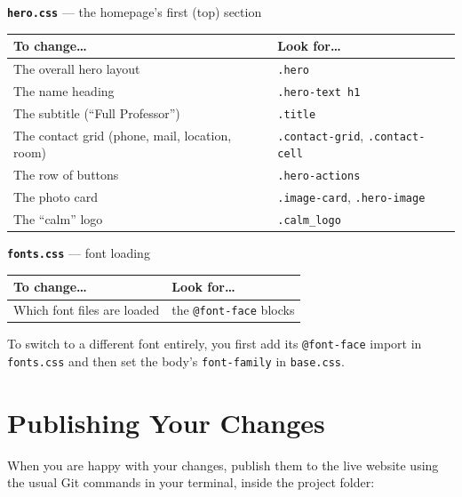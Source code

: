 \documentclass[11pt,a4paper]{article}
\newcommand{\file}[1]{\texttt{#1}}
\begin{document}
\vspace{4pt}
\noindent\textbf{\file{hero.css}} --- the homepage's first (top) section
\begin{center}
\begin{tabular}{@{}p{8.0cm}p{7.0cm}@{}}
\textbf{To change\dots} & \textbf{Look for\dots} \\[2pt]
\hline
\rule{0pt}{2.4ex}%
The overall hero layout & \texttt{.hero} \\[3pt]
The name heading & \texttt{.hero-text h1} \\[3pt]
The subtitle (``Full Professor'') & \texttt{.title} \\[3pt]
The contact grid (phone, mail, location, room) & \texttt{.contact-grid}, \texttt{.contact-cell} \\[3pt]
The row of buttons & \texttt{.hero-actions} \\[3pt]
The photo card & \texttt{.image-card}, \texttt{.hero-image} \\[3pt]
The ``calm'' logo & \texttt{.calm\_logo} \\
\end{tabular}
\end{center}

\vspace{4pt}
\noindent\textbf{\file{fonts.css}} --- font loading
\begin{center}
\begin{tabular}{@{}p{8.0cm}p{7.0cm}@{}}
\textbf{To change\dots} & \textbf{Look for\dots} \\[2pt]
\hline
\rule{0pt}{2.4ex}%
Which font files are loaded & the \texttt{@font-face} blocks \\
\end{tabular}
\end{center}

\begin{notebox}
To switch to a different font entirely, you first add its \texttt{@font-face}
import in \file{fonts.css} and then set the body's \texttt{font-family} in
\file{base.css}.
\end{notebox}

\section{Publishing Your Changes}

When you are happy with your changes, publish them to the live website
using the usual Git commands in your terminal, inside the project folder:
\end{document}
